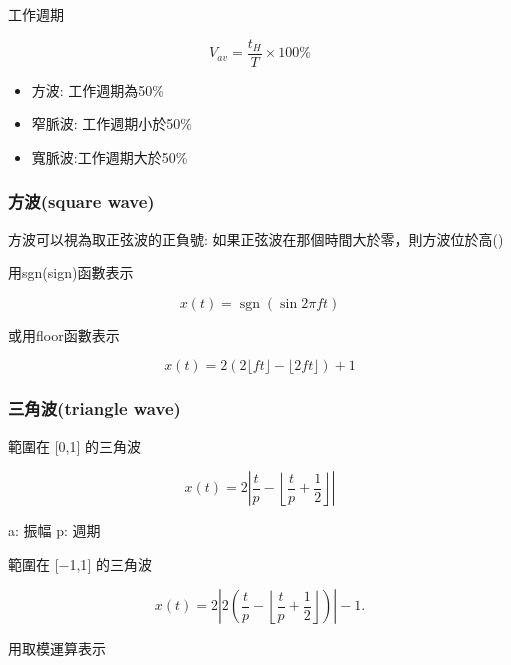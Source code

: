 \documentclass[
]{report}
\providecommand{\tightlist}{%
  \setlength{\itemsep}{0pt}\setlength{\parskip}{0pt}}
\DeclareMathOperator{\sgn}{sgn}
\begin{document}
工作週期

\[
V_{av} = \frac{t_H}{T} \times 100\%
\]

\begin{itemize}
\tightlist
\item
  方波: 工作週期為50\%
\item
  窄脈波: 工作週期小於50\%
\item
  寬脈波:工作週期大於50\%
\end{itemize}

\hypertarget{ux65b9ux6ce2square-wave}{%
\subsubsection{方波(square wave)}\label{ux65b9ux6ce2square-wave}}

方波可以視為取正弦波的正負號: 如果正弦波在那個時間大於零，則方波位於高()

用sgn(sign)函數表示

\[
x(t)=\sgn(\sin 2\pi ft)
\]


或用floor函數表示

\[
x(t)=2\left(2\lfloor ft\rfloor -\lfloor 2ft\rfloor \right)+1
\]

\hypertarget{ux4e09ux89d2ux6ce2triangle-wave}{%
\subsubsection{三角波(triangle
wave)}\label{ux4e09ux89d2ux6ce2triangle-wave}}

範圍在 {[}0,1{]} 的三角波

\[
x(t)=2\left|{\frac {t}{p}}-\left\lfloor {\frac {t}{p}}+{\frac {1}{2}}\right\rfloor \right|
\]

a: 振幅 p: 週期

範圍在 {[}−1,1{]} 的三角波

\[
x(t)=2\left|2\left({\frac {t}{p}}-\left\lfloor {\frac{t}{p}}+{\frac{1}{2}}\right\rfloor \right)\right|-1.
\]

用取模運算表示
\end{document}
